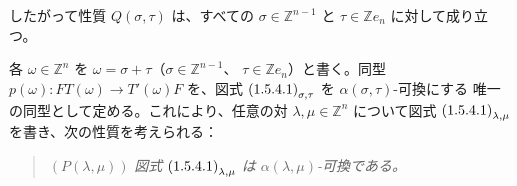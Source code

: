 したがって性質 $Q(\sigma,\tau)$ は、すべての
$\sigma\in\mathbb Z^{n-1}$ と $\tau\in\mathbb Z e_n$ に対して成り立つ。

各 $\omega\in\mathbb Z^n$ を
$\omega=\sigma+\tau$（$\sigma\in\mathbb Z^{n-1}$、
$\tau\in\mathbb Z e_n$）と書く。同型
$p(\omega)\colon FT(\omega)\longrightarrow T'(\omega)F$ を、図式
$\textup{(1.5.4.1)}_{\sigma,\tau}$ を $\alpha(\sigma,\tau)$-可換にする
唯一の同型として定める。これにより、任意の対
$\lambda,\mu\in\mathbb Z^n$ について図式
$\textup{(1.5.4.1)}_{\lambda,\mu}$ を書き、次の性質を考えられる：

\begin{quote}
  \noindent\textup{$(P(\lambda,\mu))$}\quad
  \emph{図式 $\textup{(1.5.4.1)}_{\lambda,\mu}$ は
  $\alpha(\lambda,\mu)$-可換である。}
\end{quote}
